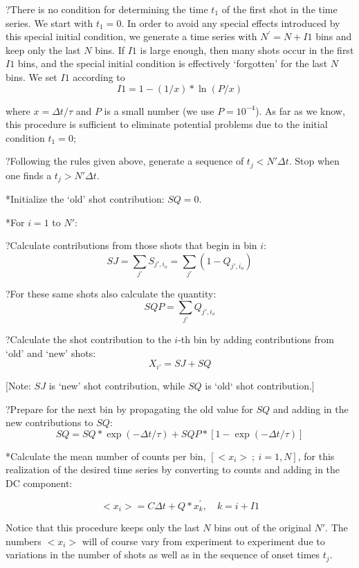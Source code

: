 \??There is no condition for determining the time $t_1$
of the first shot in the time series.  We start with $t_{1} = 0$.  In
order to avoid any special effects introduced by this special initial
condition, we generate a time series with $N^{\prime} = N +I1$ bins
and keep only the last $N$ bins.  If $I1$ is large enough, then many
shots occur in the first $I1$ bins, and the special initial condition
is effectively `forgotten' for the last $N$ bins.  We set $I1$
according to
$$I1 = 1 - (1/x)\ast\ln (P/x)$$

\itemitem{}where $x = \Delta t/\tau$ and $P$ is a small number (we use $P =
10^{-4}$).  As far as we know, this procedure is sufficient to
eliminate potential problems due to the initial condition $t_{1} = 0$;

\??Following the rules given above, generate a sequence of
$t_j < N' \Delta t$.  Stop when one finds a $t_j >
N' \Delta t$.

\**Initialize the `old' shot contribution:  $SQ = 0$.

\**For $i = 1$ to $N'$:

\??Calculate contributions from those shots that begin in
bin $i$:
$$SJ = \sum_{j'} S_{j',i_o} = \sum_{j'} \left(1 - Q_{j',i_o}\right)$$

\??For these same shots also calculate the quantity:
$$SQP = \sum_{j'} Q_{j',i_o}$$

\??Calculate the shot contribution to the $i$-th bin by
adding contributions from `old' and `new' shots:
$$X_{i'} = SJ + SQ$$

\itemitem{}[Note:  $SJ$ is `new' shot contribution, while $SQ$ is `old` shot
contribution.]

\??Prepare for the next bin by propagating the old value
for $SQ$ and adding in the new contributions to $SQ$:
$$SQ = SQ \ast \exp(-\Delta t/\tau) + SQP\ast[1-\exp(-\Delta t/\tau)]$$

\**Calculate the mean number of counts per bin, $[<x_{i}>~;~ i =
1,N]$, for this realization of the desired time series by converting
to counts and adding in the DC component:

$$<x_{i}> = C\Delta t + Q\ast x_{k}^{\prime}, \quad k=i+I1$$

\item{}Notice that this procedure keeps only the last $N$ bins out of the
original $N'$. The numbers $<x_i>$ will of course vary from
experiment to experiment due to variations in the number of shots as
well as in the sequence of onset times $t_j$.

